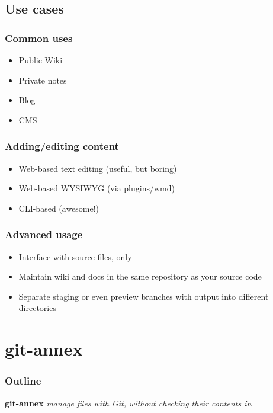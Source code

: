 \documentclass[t]{beamer}
\begin{document}
\subsection{Use cases}

\begin{frame}
	\frametitle{Common uses}
	\begin{itemize}
		\item Public Wiki
		\item Private notes
		\item Blog
		\item CMS
	\end{itemize}
\end{frame}

\begin{frame}
	\frametitle{Adding/editing content}
	\begin{itemize}
		\item Web-based text editing (useful, but boring)
		\item Web-based WYSIWYG (via plugins/wmd)
		\item CLI-based (awesome!)
	\end{itemize}
\end{frame}

\begin{frame}
	\frametitle{Advanced usage}
	\begin{itemize}
		\item Interface with source files, only
		\item Maintain wiki and docs in the same repository as your source code
		\item Separate staging or even preview branches with output into different directories
	\end{itemize}
\end{frame}


\section{git-annex}

\begin{frame}
	\frametitle{Outline}
	\tableofcontents[currentsection]
\end{frame}

\begin{frame}
		\begin{center}
			\vfill
			\vfill
			\textbf{git-annex}
			\vfill
			\textit{manage files with Git, without checking their contents in}
			\vfill
			\vfill
		\end{center}
\end{frame}
\end{document}
